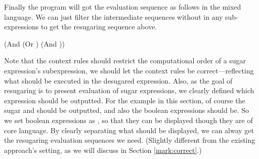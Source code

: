 Finally the program  will got the evaluation sequence as follows in the mixed language. We can just filter the intermediate sequences without  in any sub-expressions to get the resugaring sequence above. 


\begin{Codes}
    (And (Or \true \false) (And \false \true))
\OneStep{ \false}
\end{Codes}

Note that the context rules should restrict the computational order of a sugar expression's subexpression, we should let the context rules be correct---reflecting what should be executed in the desugared expression. Also, as the goal of resugaring is to present evaluation of sugar expressions, we clearly defined which expression should be outputted. For the example in this section, of course the sugar  and  should be outputted, and also the boolean expressions should be. So we set boolean expressions as , so that they can be displayed though they are of core language. By clearly separating what should be displayed, we can alway get the resugaring evaluation sequences we need. (Slightly different from the existing approach's setting, as we will discuss in Section \ref{mark:correct}.)